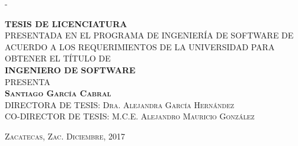 \begin{titlingpage}
\begin{SingleSpace}
\begin{adjustwidth*}{\unitlength}{-\unitlength}
\begin{center}

\vspace{14 mm}
{\Large \textbf{TESIS DE LICENCIATURA}}\\

\vspace{14mm}
{PRESENTADA EN EL PROGRAMA DE INGENIERÍA DE SOFTWARE DE ACUERDO A LOS REQUERIMIENTOS DE LA UNIVERSIDAD PARA OBTENER EL TÍTULO DE}\\

\vspace{14mm}
{\Large \textbf{INGENIERO DE SOFTWARE}}\\

\vspace{14mm}
{{PRESENTA}}\\

\vspace{14mm}
{\Large\textsc{\textbf{Santiago García Cabral}%
}}\\

\vspace{14mm}
{\textsc{DIRECTORA DE TESIS: Dra. Alejandra Garc\'ia Hern\'andez}}\\
{\textsc{CO-DIRECTOR DE TESIS: M.C.E. Alejandro Mauricio Gonz\'alez}}


\vspace{8mm}
\end{center}
\begin{flushright}
{\small {\large\textsc{Zacatecas, Zac. Diciembre, 2017}}}
\end{flushright}
\end{adjustwidth*}
\end{SingleSpace}
\end{titlingpage}